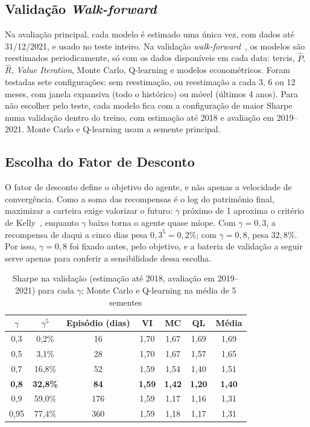 \documentclass[conference]{IEEEtran}
\begin{document}
\subsection{Validação \textit{Walk-forward}}

Na avaliação principal, cada modelo é estimado uma única vez, com dados até 31/12/2021, e usado no teste inteiro. Na validação \textit{walk-forward}~\cite{pardo2008}, os modelos são reestimados periodicamente, só com os dados disponíveis em cada data: tercis, $\hat{P}$, $\hat{R}$, \textit{Value Iteration}, Monte Carlo, Q-learning e modelos econométricos. Foram testadas sete configurações: sem reestimação, ou reestimação a cada 3, 6 ou 12 meses, com janela expansiva (todo o histórico) ou móvel (últimos 4 anos). Para não escolher pelo teste, cada modelo fica com a configuração de maior Sharpe numa validação dentro do treino, com estimação até 2018 e avaliação em 2019--2021. Monte Carlo e Q-learning usam a semente principal.

\subsection{Escolha do Fator de Desconto}
\label{sec:gamma}

O fator de desconto define o objetivo do agente, e não apenas a velocidade de convergência. Como a soma das recompensas é o log do patrimônio final, maximizar a carteira exige valorizar o futuro: $\gamma$ próximo de 1 aproxima o critério de Kelly~\cite{kelly1956}, enquanto $\gamma$ baixo torna o agente quase míope. Com $\gamma = 0{,}3$, a recompensa de daqui a cinco dias pesa $0{,}3^5 = 0{,}2\%$; com $\gamma = 0{,}8$, pesa $32{,}8\%$. Por isso, $\gamma = 0{,}8$ foi fixado antes, pelo objetivo, e a bateria de validação a seguir serve apenas para conferir a sensibilidade dessa escolha.

\begin{table}[!t]
  \centering
  \caption{Sharpe na validação (estimação até 2018, avaliação em 2019--2021) para cada $\gamma$; Monte Carlo e Q-learning na média de 5 sementes}
  \label{tab:gamma}
  \footnotesize
  \setlength{\tabcolsep}{4.5pt}
  \renewcommand{\arraystretch}{1.1}
  \begin{tabular}{c c c cccc}
    \toprule
    $\gamma$ & $\gamma^5$ & Episódio (dias) & VI & MC & QL & Média \\
    \midrule
    0,3  & 0,2\%  & 16  & 1,70 & 1,67 & 1,69 & 1,69 \\
    0,5  & 3,1\%  & 28  & 1,70 & 1,67 & 1,57 & 1,65 \\
    0,7  & 16,8\% & 52  & 1,59 & 1,54 & 1,40 & 1,51 \\
    \midrule
    \textbf{0,8} & \textbf{32,8\%} & \textbf{84} & \textbf{1,59} & \textbf{1,42} & \textbf{1,20} & \textbf{1,40} \\
    0,9  & 59,0\% & 176 & 1,59 & 1,17 & 1,16 & 1,31 \\
    0,95 & 77,4\% & 360 & 1,59 & 1,18 & 1,17 & 1,31 \\
    \bottomrule
  \end{tabular}
\end{table}
\end{document}
